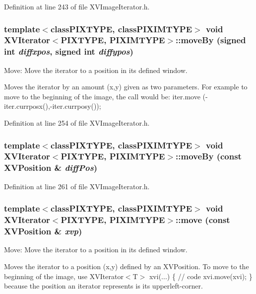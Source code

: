 Definition at line 243 of file XVImage\-Iterator.h.\label{XVIterator_a18}
\hypertarget{class_XVIterator_a18}{
\subsubsection[moveBy]{\setlength{\rightskip}{0pt plus 5cm}template$<$classPIXTYPE, classPIXIMTYPE$>$ void XVIterator$<$PIXTYPE, PIXIMTYPE$>$::move\-By (signed int {\em diffxpos}, signed int {\em diffypos})}}


Move: Move the iterator to a position in its defined window.

Moves the iterator by an amount (x,y) given as two parameters. For example to move to the beginning of the image, the call would be: iter.move (-iter.currposx(),-iter.currposy()); 

Definition at line 254 of file XVImage\-Iterator.h.\label{XVIterator_a19}
\hypertarget{class_XVIterator_a19}{
\subsubsection[moveBy]{\setlength{\rightskip}{0pt plus 5cm}template$<$classPIXTYPE, classPIXIMTYPE$>$ void XVIterator$<$PIXTYPE, PIXIMTYPE$>$::move\-By (const XVPosition \& {\em diff\-Pos})}}




Definition at line 261 of file XVImage\-Iterator.h.\label{XVIterator_a20}
\hypertarget{class_XVIterator_a20}{
\subsubsection[move]{\setlength{\rightskip}{0pt plus 5cm}template$<$classPIXTYPE, classPIXIMTYPE$>$ void XVIterator$<$PIXTYPE, PIXIMTYPE$>$::move (const XVPosition \& {\em xvp})}}


Move: Move the iterator to a position in its defined window.

Moves the iterator to a position (x,y) defined by an XVPosition. To move to the beginning of the image, use  XVIterator$<$T$>$ xvi(...) \{  // code xvi.move(xvi); \} because the position an iterator represents is its upperleft-corner. 

